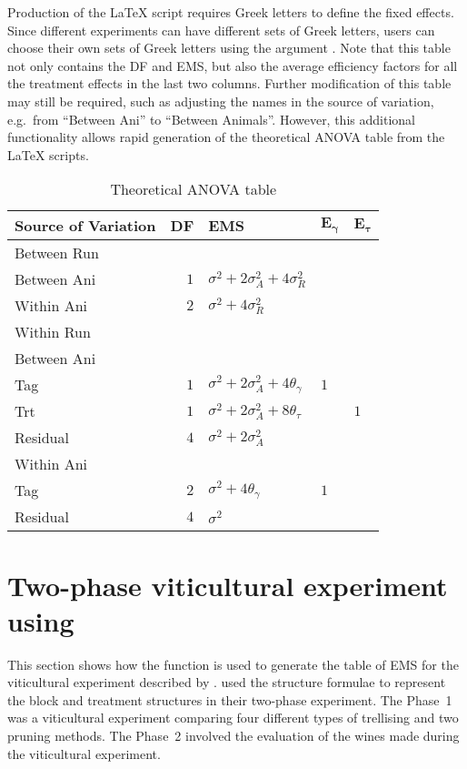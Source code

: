 \documentclass[article]{jss}
\begin{document}
Production of the {\LaTeX} script requires Greek letters to define the fixed effects. Since different experiments can have different sets of Greek letters, users can choose their own sets of Greek letters using the argument . Note that this table not only contains the DF and EMS, but also the average efficiency factors for all the treatment effects in the last two columns. Further modification of this table may still be required, such as adjusting the names in the source of variation, e.g.\ from ``Between Ani'' to ``Between Animals''. However, this additional functionality allows rapid generation of the theoretical ANOVA table from the {\LaTeX} scripts.  


\begin{table}[ht]
\centering
 \caption{Theoretical ANOVA table}
 \begin{tabular}[t]{lrlll} 
 \toprule 
 \multicolumn{1}{l}{\textbf{Source of Variation}} & \multicolumn{1}{l}{\textbf{DF}} & \multicolumn{1}{l}{\textbf{EMS}}& \multicolumn{1}{l}{$\bm{E_{\gamma}}$}&\multicolumn{1}{l}{$\bm{E_{\tau}}$}\\ 
 \midrule 
 Between Run &  &  & & \\ 
 \quad Between Ani & $1$ & $\sigma^2+2\sigma_{A}^2+4\sigma_{R}^2$ & & \\ \hline 
 \quad Within Ani & $2$ & $\sigma^2+4\sigma_{R}^2$ & & \\ \hline 
 Within Run &  &  & & \\ 
 \quad Between Ani &  &  & & \\ 
 \quad \quad Tag & $1$ & $\sigma^2+2\sigma_{A}^2+4\theta_{\gamma}$ &$1$ & \\ 
 \quad \quad Trt & $1$ & $\sigma^2+2\sigma_{A}^2+8\theta_{\tau}$ & & $1$\\ 
 \quad \quad Residual & $4$ & $\sigma^2+2\sigma_{A}^2$ & & \\ \hline 
 \quad Within Ani &  &  & & \\ 
 \quad \quad Tag & $2$ & $\sigma^2+4\theta_{\gamma}$ &$1$ & \\ 
 \quad \quad Residual & $4$ & $\sigma^2$ & & \\ 
 \bottomrule 
 \end{tabular} 
  \label{tab:ouputFromR} 
\end{table} 

\section[Example]{Two-phase viticultural experiment using }\label{sec:example}
This section shows how the function  is used to generate the table of EMS for the viticultural experiment described by \cite{Brien1999}. \citeauthor{Brien1999} used the structure formulae to represent the block and treatment structures in their two-phase experiment. The Phase~1 was a viticultural experiment comparing four different types of trellising and two pruning methods. The Phase~2 involved the evaluation of the wines made during the viticultural experiment.
\end{document}
